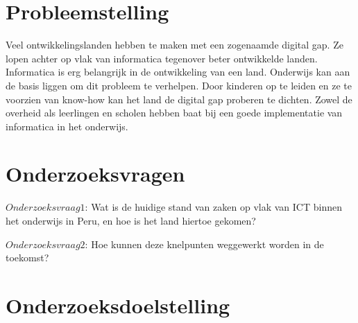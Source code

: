 \section{Probleemstelling}
\label{sec:probleemstelling}
Veel ontwikkelingslanden hebben te maken met een zogenaamde digital gap. Ze lopen achter op vlak van informatica tegenover beter ontwikkelde landen. Informatica is erg belangrijk in de ontwikkeling van een land. Onderwijs kan aan de basis liggen om dit probleem te verhelpen. Door kinderen op te leiden en ze te voorzien van know-how kan het land de digital gap proberen te dichten. Zowel de overheid als leerlingen en scholen hebben baat bij een goede implementatie van informatica in het onderwijs. 


\section{Onderzoeksvragen}
\label{sec:onderzoeksvraag}


$Onderzoeksvraag 1$: Wat is de huidige stand van zaken op vlak van ICT binnen het onderwijs in Peru, en hoe is het land hiertoe gekomen?

$Onderzoeksvraag 2$: Hoe kunnen deze knelpunten weggewerkt worden in de toekomst?

\section{Onderzoeksdoelstelling}
\label{sec:onderzoeksdoelstelling}

